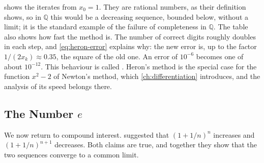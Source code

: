  shows the iterates from $x_0=1$. They are rational numbers, as their definition shows, so in $\mathbb Q$ this would be a decreasing sequence, bounded below, without a limit; it is the standard example of the failure of completeness in $\mathbb Q$. The table also shows how fast the method is. The number of correct digits roughly doubles in each step, and \eqref{eq:heron-error} explains why: the new error is, up to the factor $1/(2x_k)\approx0.35$, the square of the old one. An error of $10^{-6}$ becomes one of about $10^{-12}$. This behaviour is called . Heron's method is the special case for the function $x^2-2$ of Newton's method, which \cref{ch:differentiation} introduces, and the analysis of its speed belongs there.

\begin{table}
\end{table}

\subsection{The Number \texorpdfstring{$e$}{e}}

We now return to compound interest.  suggested that $(1+1/n)^n$ increases and $(1+1/n)^{n+1}$ decreases. Both claims are true, and together they show that the two sequences converge to a common limit.

